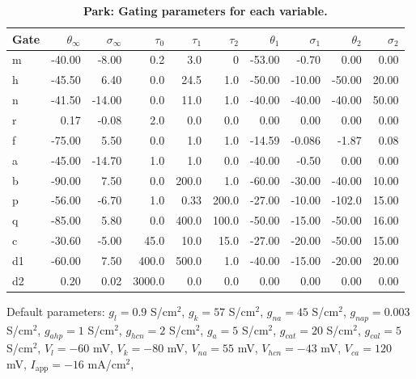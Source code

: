 \documentclass[../main.tex]{subfiles}
\begin{document}
\begin{table}[h!]
    \centering
    \begin{tabular}{|l|r|r|r|r|r|r|r|r|r|}
    \hline
    \textbf{Gate} & $\theta_{\infty}$ & $\sigma_{\infty}$ & $\tau_0$ & $\tau_1$ & $\tau_2$ & $\theta_1$ & $\sigma_1$ & $\theta_2$ & $\sigma_2$ \\
    \hline
    \hline
    m  & -40.00  & -8.00   & 0.2   & 3.0    & 0     & -53.00  & -0.70   & 0.00   & 0.00  \\
    h  & -45.50  & 6.40    & 0.0   & 24.5   & 1.0   & -50.00  & -10.00  & -50.00 & 20.00 \\
    n  & -41.50  & -14.00  & 0.0   & 11.0   & 1.0   & -40.00  & -40.00  & -40.00 & 50.00 \\
    r  & 0.17    & -0.08   & 2.0   & 0.0    & 0.0   & 0.00    & 0.00    & 0.00   & 0.00  \\
    f  & -75.00  & 5.50    & 0.0   & 1.0    & 1.0   & -14.59  & -0.086  & -1.87  & 0.08  \\
    a  & -45.00  & -14.70  & 1.0   & 1.0    & 0.0   & -40.00  & -0.50   & 0.00   & 0.00  \\
    b  & -90.00  & 7.50    & 0.0   & 200.0  & 1.0   & -60.00  & -30.00  & -40.00 & 10.00 \\
    p  & -56.00  & -6.70   & 1.0   & 0.33   & 200.0 & -27.00  & -10.00  & -102.0 & 15.00 \\
    q  & -85.00  & 5.80    & 0.0   & 400.0  & 100.0 & -50.00  & -15.00  & -50.00 & 16.00 \\
    c  & -30.60  & -5.00   & 45.0  & 10.0   & 15.0  & -27.00  & -20.00  & -50.00 & 15.00 \\
    d1 & -60.00  & 7.50    & 400.0 & 500.0  & 1.0   & -40.00  & -15.00  & -20.00 & 20.00 \\
    d2 & 0.20    & 0.02    & 3000.0& 0.0    & 0.0   & 0.00    & 0.00    & 0.00   & 0.00  \\
    \hline
    \end{tabular}
    \caption[Gating parameters for each variable]{
        \textbf{Park: Gating parameters for each variable.}
    }
    \end{table}

    
Default parameters:
$g_l = 0.9$ S/cm$^2$,
$g_k = 57$ S/cm$^2$,
$g_{na} = 45$ S/cm$^2$,
$g_{nap} = 0.003$ S/cm$^2$,
$g_{ahp} = 1$ S/cm$^2$,
$g_{hcn} = 2$ S/cm$^2$,
$g_a = 5$ S/cm$^2$,
$g_{cat} = 20$ S/cm$^2$,
$g_{cal} = 5$ S/cm$^2$,
$V_l = -60$ mV,
$V_k = -80$ mV,
$V_{na} = 55$ mV,
$V_{hcn} = -43$ mV,
$V_{ca} = 120$ mV,
$I_{\text{app}} = -16$ mA/cm$^2$,
\end{document}
